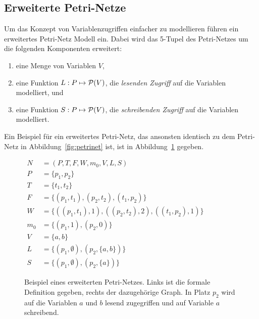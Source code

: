 \subsection{Erweiterte Petri-Netze}
Um das Konzept von Variablenzugriffen einfacher zu modellieren führen \textcite{Goel1990} ein erweitertes Petri-Netz Modell ein. Dabei wird das 5-Tupel des Petri-Netzes um die folgenden Komponenten erweitert:
\begin{enumerate}
	\item eine Menge von Variablen $V$,
	\item eine Funktion $L: P \mapsto \mathcal{P}(V)$, die \emph{lesenden Zugriff} auf die Variablen modelliert, und
	\item eine Funktion $S: P \mapsto \mathcal{P}(V)$, die \emph{schreibenden Zugriff} auf die Variablen modelliert.
\end{enumerate}
Ein Beispiel für ein erweitertes Petri-Netz, das ansonsten identisch zu dem Petri-Netz in Abbildung~\ref{fig:petrinet} ist, ist in Abbildung~\ref{fig:augpetrinet} gegeben.
\begin{figure}
\centering
	\begin{minipage}[c]{.49\textwidth}
		$\begin{aligned}
			N &= (P,T,F,W,m_0, V, L, S)\\
			P &= \{p_1, p_2\}\\
			T &= \{t_1, t_2\}\\
			F &= \{(p_1, t_1), (p_2, t_2), (t_1, p_2)\}\\
			W &= \{((p_1, t_1),1), ((p_2, t_2),2), ((t_1, p_2), 1)\}\\
			m_0 &= \{(p_1, 1), (p_2, 0)\}\\
			V &= \{a,b\}\\
			L &= \{(p_1,\emptyset),(p_2,\{a,b\})\}\\
			S &= \{(p_1,\emptyset),(p_2,\{a\})\}
		\end{aligned}$
	\end{minipage}
	\hfill
	\begin{minipage}[c]{.49\textwidth}
	\end{minipage}
	\caption{Beispiel eines erweiterten Petri-Netzes. Links ist die formale Definition gegeben, rechts der dazugehörige Graph. In Platz $p_2$ wird auf die Variablen $a$ und $b$ lesend zugegriffen und auf Variable $a$ schreibend.}\label{fig:augpetrinet}
\end{figure}